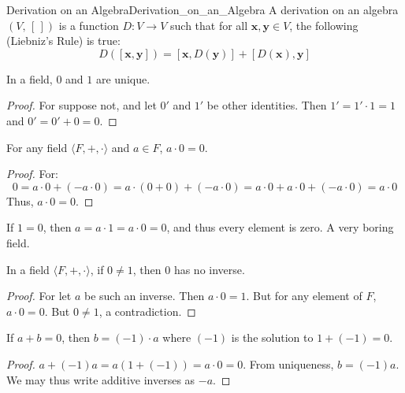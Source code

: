     \begin{fdefinition}{Derivation on an Algebra}{Derivation_on_an_Algebra}
        A derivation on an algebra $(V,\,[\,])$ is a function
        $D:V\rightarrow{V}$ such that for all $\mathbf{x},\mathbf{y}\in{V}$,
        the following (Liebniz's Rule) is true:
        \begin{equation}
            D([\mathbf{x},\mathbf{y}])
            =[\mathbf{x},D(\mathbf{y})]+[D(\mathbf{x}),\mathbf{y}]
        \end{equation}
    \end{fdefinition}
    \begin{theorem}
        In a field, $0$ and $1$ are unique.
    \end{theorem}
    \begin{proof}
        For suppose not, and let $0'$ and $1'$ be other identities.
        Then $1'=1'\cdot 1 = 1$ and $0'=0'+0=0$.
    \end{proof}
    \begin{theorem}
        For any field $\langle{F},+,\cdot\rangle$ and $a\in{F}$, $a\cdot{0}=0$.
    \end{theorem}
    \begin{proof}
        For:
        \begin{equation}
            0=a\cdot{0}+(\minus{a}\cdot{0})
             =a\cdot(0+0)+(\minus{a}\cdot{0})
             =a\cdot{0}+a\cdot{0}+(\minus{a}\cdot{0})
             =a\cdot 0
        \end{equation}
        Thus, $a\cdot{0}=0$.
    \end{proof}
    If $1=0$, then $a=a\cdot{1}=a\cdot{0}=0$, and thus every element is
    zero. A very boring field.
    \begin{theorem}
        In a field $\langle F, +,\cdot \rangle$, if $0\ne 1$, then $0$ has no
        inverse.
    \end{theorem}
    \begin{proof}
        For let $a$ be such an inverse. Then $a\cdot{0}=1$. But for any element
        of $F$, $a\cdot{0}=0$. But $0\ne{1}$, a contradiction.
    \end{proof}
    \begin{theorem}
        If $a+b=0$, then $b=(\minus{1})\cdot{a}$ where $(\minus{1})$ is the
        solution to $1+(\minus{1})=0$.
    \end{theorem}
    \begin{proof}
        $a+(\minus{1})a=a(1+(\minus{1}))=a\cdot{0}=0$. From uniqueness,
        $b=(\minus{1})a$. We may thus write additive inverses as $\minus{a}$.
    \end{proof}
